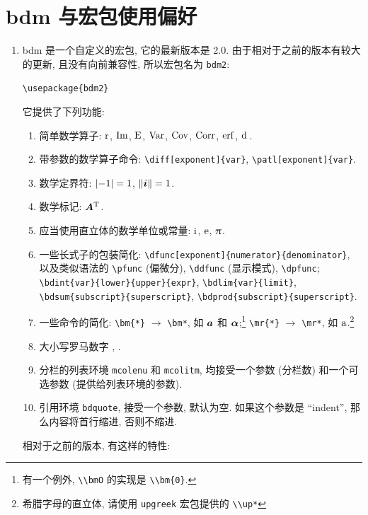 \documentclass[UTF8,no-math]{ctexart}
\numberwithin{enumi}{section}
\begin{document}
    \section{bdm 与宏包使用偏好}
    \begin{enumerate}
        \item bdm 是一个自定义的宏包, 它的最新版本是 2.0. 由于相对于之前的版本有较大的更新, 且没有向前兼容性, 所以宏包名为 \texttt{bdm2}:\par 
        \verb|\usepackage{bdm2}| \par 
        它提供了下列功能:
        \begin{enumerate}
            \item 简单数学算子: $\operatorname{r}$, $\operatorname{Im}$, $\operatorname{E}$, $\operatorname{Var}$, $\operatorname{Cov}$, $\operatorname{Corr}$, $\operatorname{erf}$, $\dif\ $.
            \item 带参数的数学算子命令: \verb|\diff[exponent]{var}|, \verb|\patl[exponent]{var}|.
            \item 数学定界符: $\left\lvert-1\right\rvert=1$, $\left\lVert\bm{i}\right\rVert=1$.
            \item 数学标记: $\bm{A}^\mathrm{T}$.
            \item 应当使用直立体的数学单位或常量: $\mathrm{i}$, $\mathrm{e}$, $\uppi$.
            \item 一些长式子的包装简化: \verb|\dfunc[exponent]{numerator}{denominator}|, 以及类似语法的 \verb|\pfunc| (偏微分), \verb|\ddfunc| (显示模式), \verb|\dpfunc|; \verb|\bdint{var}{lower}{upper}{expr}|, \verb|\bdlim{var}{limit}|, \verb|\bdsum{subscript}{superscript}|, \verb|\bdprod{subscript}{superscript}|.
            \item 一些命令的简化: \verb|\bm{*}| $\to$ \verb|\bm*|, 如 $\bm{a}$ 和 $\bm{\alpha}$;\footnote{有一个例外, \lstinline|\\bmO| 的实现是 \lstinline|\\bm{0}|.} \verb|\mr{*}| $\to$ \verb|\mr*|, 如 $\mathrm{a}$.\footnote{希腊字母的直立体, 请使用 \texttt{upgreek} 宏包提供的 \lstinline|\\up*|}
            \item 大小写罗马数字 , .
            \item 分栏的列表环境 \verb|mcolenu| 和 \verb|mcolitm|, 均接受一个参数 (分栏数) 和一个可选参数 (提供给列表环境的参数).
            \item 引用环境 \verb|bdquote|, 接受一个参数, 默认为空. 如果这个参数是 ``indent'', 那么内容将首行缩进, 否则不缩进.
        \end{enumerate}
        相对于之前的版本, 有这样的特性:
        \begin{enumerate}

\end{enumerate}
\end{enumerate}
\end{document}
